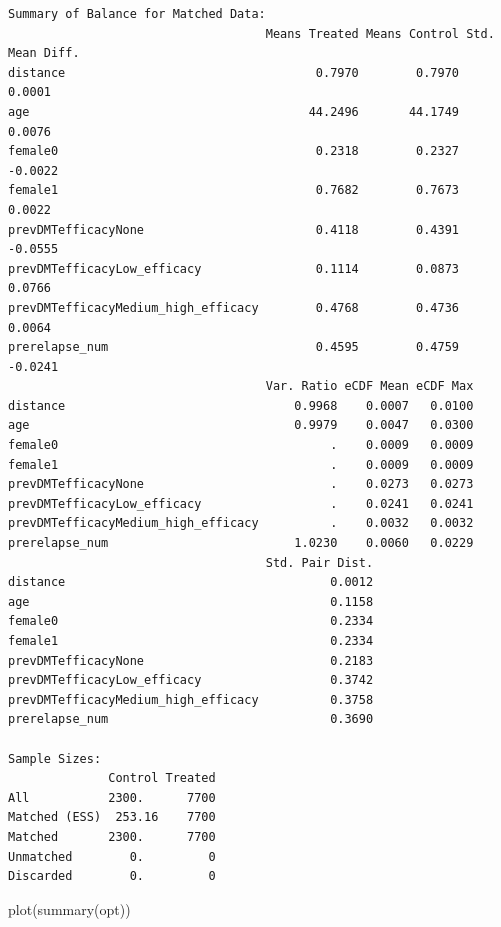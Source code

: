 \documentclass[
  letterpaper,
  DIV=11,
  numbers=noendperiod]{scrreprt}
\newenvironment{Shaded}{\begin{snugshade}}{\end{snugshade}}
\newcommand{\FunctionTok}[1]{\textcolor[rgb]{0.28,0.35,0.67}{#1}}
\newcommand{\NormalTok}[1]{\textcolor[rgb]{0.00,0.23,0.31}{#1}}
\begin{document}
\begin{verbatim}
Summary of Balance for Matched Data:
                                    Means Treated Means Control Std. Mean Diff.
distance                                   0.7970        0.7970          0.0001
age                                       44.2496       44.1749          0.0076
female0                                    0.2318        0.2327         -0.0022
female1                                    0.7682        0.7673          0.0022
prevDMTefficacyNone                        0.4118        0.4391         -0.0555
prevDMTefficacyLow_efficacy                0.1114        0.0873          0.0766
prevDMTefficacyMedium_high_efficacy        0.4768        0.4736          0.0064
prerelapse_num                             0.4595        0.4759         -0.0241
                                    Var. Ratio eCDF Mean eCDF Max
distance                                0.9968    0.0007   0.0100
age                                     0.9979    0.0047   0.0300
female0                                      .    0.0009   0.0009
female1                                      .    0.0009   0.0009
prevDMTefficacyNone                          .    0.0273   0.0273
prevDMTefficacyLow_efficacy                  .    0.0241   0.0241
prevDMTefficacyMedium_high_efficacy          .    0.0032   0.0032
prerelapse_num                          1.0230    0.0060   0.0229
                                    Std. Pair Dist.
distance                                     0.0012
age                                          0.1158
female0                                      0.2334
female1                                      0.2334
prevDMTefficacyNone                          0.2183
prevDMTefficacyLow_efficacy                  0.3742
prevDMTefficacyMedium_high_efficacy          0.3758
prerelapse_num                               0.3690

Sample Sizes:
              Control Treated
All           2300.      7700
Matched (ESS)  253.16    7700
Matched       2300.      7700
Unmatched        0.         0
Discarded        0.         0
\end{verbatim}

\begin{Shaded}
\begin{Highlighting}[]
\FunctionTok{plot}\NormalTok{(}\FunctionTok{summary}\NormalTok{(opt))}
\end{Highlighting}
\end{Shaded}
\end{document}
